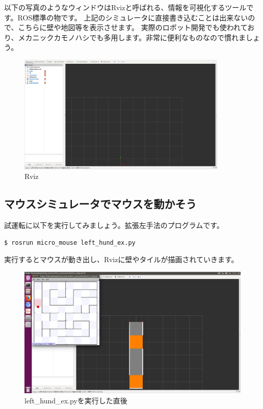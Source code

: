 \documentclass[11pt,a4paper]{jsarticle}
\begin{document}
以下の写真のようなウィンドウはRvizと呼ばれる、情報を可視化するツールです。ROS標準の物です。
上記のシミュレータに直接書き込むことは出来ないので、こちらに壁や地図等を表示させます。
実際のロボット開発でも使われており、メカニックカモノハシでも多用します。非常に便利なものなので慣れましょう。
\begin{figure}[h]
  \begin{center}
    \includegraphics[width=100mm]{./mms_rviz.png}
  \end{center}
  \label{mms_simulator}
  \caption{Rviz}
\end{figure}



\subsection{マウスシミュレータでマウスを動かそう}

試運転に以下を実行してみましょう。拡張左手法のプログラムです。
\begin{lstlisting}[frame=single]
$ rosrun micro_mouse left_hund_ex.py
\end{lstlisting}

実行するとマウスが動き出し、Rvizに壁やタイルが描画されていきます。
\begin{figure}[h]
  \begin{center}
    \includegraphics[width=128mm]{./mms_test_pause.png}
  \end{center}
  \label{mms_simulator}
  \caption{left\_hund\_ex.pyを実行した直後}
\end{figure}
\end{document}
